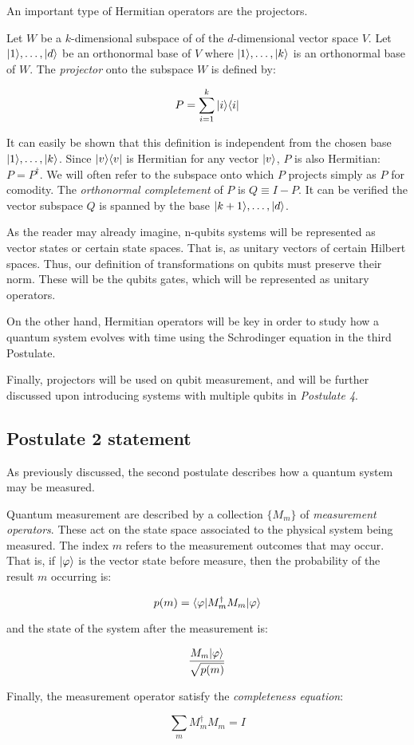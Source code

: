 An important type of Hermitian operators are the projectors.

\begin{definition}
	Let $W$ be a $k$-dimensional subspace of of the $d$-dimensional vector space $V$. Let $|1\rangle, \dots, |d\rangle$ be an orthonormal base of $V$ where $|1\rangle, \dots, |k\rangle$ is an orthonormal base of $W$. The \emph{projector} onto the subspace $W$ is defined by:
	
	$$ P = \sum_{i=1}^k |i \rangle\langle i| $$
\end{definition}

It can easily be shown that this definition is independent from the chosen base $|1\rangle, \dots, |k\rangle$. Since $|v \rangle\langle v|$ is Hermitian for any vector $|v\rangle$, $P$ is also Hermitian: $P = P^\dagger$. We will often refer to the subspace onto which $P$ projects simply as $P$ for comodity. The \emph{orthonormal completement} of $P$ is $Q \equiv I - P$. It can be verified the vector subspace $Q$ is spanned by the base $|k+1\rangle, \dots, |d\rangle$.

As the reader may already imagine, n-qubits systems will be represented as vector states or certain state spaces. That is, as unitary vectors of certain Hilbert spaces. Thus, our definition of transformations on qubits must preserve their norm. These will be the qubits gates, which will be represented as unitary operators.

On the other hand, Hermitian operators will be key in order to study how a quantum system evolves with time using the Schrodinger equation in the third Postulate.

Finally, projectors will be used on qubit measurement, and will be further discussed upon introducing systems with multiple qubits in \emph{Postulate 4}.


\subsection{Postulate 2 statement}


As previously discussed, the second postulate describes how a quantum system may be measured.

\begin{postulate}
	Quantum measurement are described by a collection $\{M_m\}$ of \emph{measurement operators}. These act on the state space associated to the physical system being measured. The index $m$ refers to the measurement outcomes that may occur. That is, if $|\varphi\rangle$ is the vector state before measure, then the probability of the result $m$ occurring is:
	
	$$p(m) = \langle\varphi|M_m^\dagger M_m|\varphi\rangle $$
	
	and the state of the system after the measurement is:
	
	$$ \frac{M_m|\varphi\rangle}{\sqrt{p(m)}}$$
	
	Finally, the measurement operator satisfy the \emph{completeness equation}: 
	
	$$\sum_m M_m^\dagger M_m = I$$
\end{postulate}

